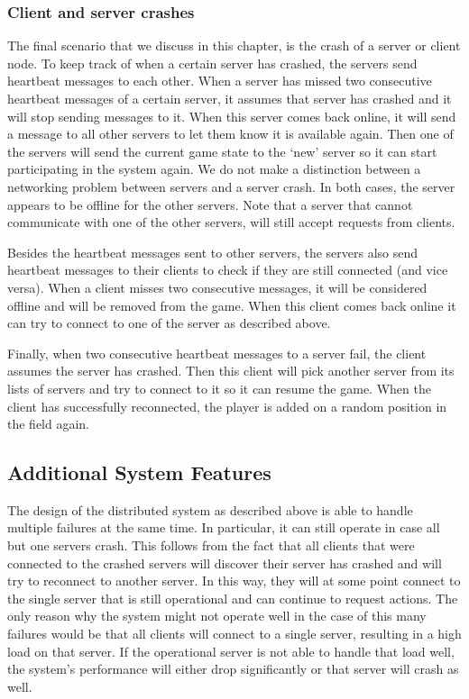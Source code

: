 \subsubsection{Client and server crashes}
\label{subsubsec:client_server_crashes}
The final scenario that we discuss in this chapter, is the crash of a server or client node. 
To keep track of when a certain server has crashed, the servers send heartbeat messages to each other. 
When a server has missed two consecutive heartbeat messages of a certain server, it assumes that server has crashed and it will stop sending messages to it.
When this server comes back online, it will send a message to all other servers to let them know it is available again. 
Then one of the servers will send the current game state to the `new' server so it can start participating in the system again.
We do not make a distinction between a networking problem between servers and a server crash. 
In both cases, the server appears to be offline for the other servers. 
Note that a server that cannot communicate with one of the other servers, will still accept requests from clients.

Besides the heartbeat messages sent to other servers, the servers also send heartbeat messages to their clients to check if they are still connected (and vice versa). 
When a client misses two consecutive messages, it will be considered offline and will be removed from the game.
When this client comes back online it can try to connect to one of the server as described above.

Finally, when two consecutive heartbeat messages to a server fail, the client assumes the server has crashed. 
Then this client will pick another server from its lists of servers and try to connect to it so it can resume the game. 
When the client has successfully reconnected, the player is added on a random position in the field again.

\subsection{Additional System Features}
\label{subsec:additional_features}
The design of the distributed system as described above is able to handle multiple failures at the same time. 
In particular, it can still operate in case all but one servers crash. 
This follows from the fact that all clients that were connected to the crashed servers will discover their server has crashed and will try to reconnect to another server.
In this way, they will at some point connect to the single server that is still operational and can continue to request actions.
The only reason why the system might not operate well in the case of this many failures would be that all clients will connect to a single server, resulting in a high load on that server.
If the operational server is not able to handle that load well, the system's performance will either drop significantly or that server will crash as well.

 
